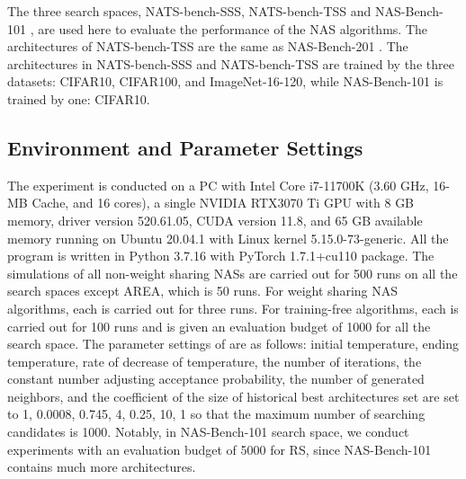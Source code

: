 \documentclass[sigconf]{acmart}
\begin{document}
    The three search spaces, NATS-bench-SSS, NATS-bench-TSS 
    \cite{Dong_2021} and NAS-Bench-101 \cite{ying2019nasbench101}, are used 
    here to evaluate the performance of the NAS algorithms. The architectures 
    of NATS-bench-TSS are the same as NAS-Bench-201 \cite{dong2020nasbench201}. 
    The architectures in NATS-bench-SSS and NATS-bench-TSS are trained by the three datasets: 
    CIFAR10, CIFAR100, and ImageNet-16-120, while NAS-Bench-101 is trained by one: 
    CIFAR10. 

    \subsection{Environment and Parameter Settings}
    The experiment is conducted on a PC with Intel Core i7-11700K (3.60 GHz, 16-MB Cache, and 16 cores), 
    a single NVIDIA RTX3070 Ti GPU with 8 GB memory, driver version 520.61.05, CUDA version 11.8, and 
    65 GB available memory running on Ubuntu 20.04.1 with Linux kernel 5.15.0-73-generic. All the program 
    is written in Python 3.7.16 with PyTorch 1.7.1+cu110 package. The simulations of all 
    non-weight sharing NASs are carried out for 500 runs on all the search spaces except AREA, which is 50 runs. 
    For weight sharing NAS algorithms, each is carried out for three runs. For training-free 
    algorithms, each is carried out for 100 runs and is given an evaluation 
    budget of 1000 for all the search space. The parameter settings of \palg{} are as follows: 
    initial temperature, ending temperature, rate of decrease of temperature, the number of iterations, 
    the constant number adjusting acceptance probability, the number of generated neighbors, and 
    the coefficient of the size of historical best architectures set are set 
    to 1, 0.0008, 0.745, 4, 0.25, 10, 1 so that the maximum number of searching candidates is 1000. 
    Notably, in NAS-Bench-101 search space, we conduct experiments with an evaluation budget of 5000 for RS, 
    since NAS-Bench-101 contains much more architectures. 
\end{document}
